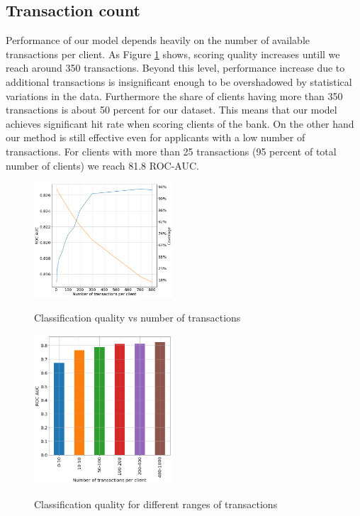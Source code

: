\documentclass[sigconf]{acmart}
\begin{document}
\subsection{Transaction count}

Performance of our model depends heavily on the number of available transactions per client. As Figure \ref{fig-tc} shows, scoring quality increases untill we reach around 350 transactions. Beyond this level, performance increase due to additional transactions is insignificant enough to be overshadowed by statistical variations in the data. Furthermore the share of clients having more than 350 transactions is about 50 percent for our dataset. This means that our model achieves significant hit rate when scoring clients of the bank. On the other hand our method is still effective even for applicants with a low number of transactions. For clients with more than 25 transactions (95 percent of total number of clients) we reach 81.8 ROC-AUC. 

\begin{figure}[ht]
  \caption{Classification quality vs number of transactions}
  \includegraphics[width=0.46\textwidth]{figures/information-vs-accuracy-max.png}
  \label{fig-tc}
\end{figure}

\begin{figure}[ht]
  \caption{Classification quality for different ranges of transactions}
  \includegraphics[width=0.46\textwidth]{figures/information-vs-accuracy-bins.png}
  \label{fig-tcb}
\end{figure}
\end{document}

